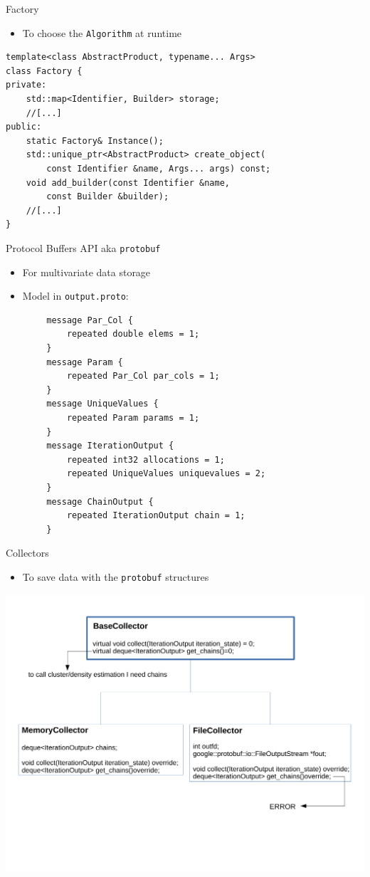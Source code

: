 \begin{frame}[fragile]{Factory}
\begin{itemize}
	\item To choose the \verb|Algorithm| at runtime
\end{itemize}

\begin{verbatim}
template<class AbstractProduct, typename... Args>
class Factory {
private:
    std::map<Identifier, Builder> storage;
    //[...]
public:
    static Factory& Instance();
    std::unique_ptr<AbstractProduct> create_object(
        const Identifier &name, Args... args) const;
    void add_builder(const Identifier &name,
        const Builder &builder);
    //[...]
}
\end{verbatim}
\end{frame}


\begin{frame}[fragile] {Protocol Buffers API aka \texttt{protobuf}}
\begin{itemize}
	\item For multivariate data storage
	\item Model in \texttt{output.proto}:
\end{itemize}
\begin{small}
\begin{verbatim}
        message Par_Col {
            repeated double elems = 1;
        }
        message Param {
            repeated Par_Col par_cols = 1;
        }
        message UniqueValues {
            repeated Param params = 1;
        }
        message IterationOutput {
            repeated int32 allocations = 1;
            repeated UniqueValues uniquevalues = 2;
        }
        message ChainOutput {
            repeated IterationOutput chain = 1;
        }
\end{verbatim}
\end{small}
\end{frame}


\begin{frame}{Collectors}
\begin{itemize}
	\item To save data with the \texttt{protobuf} structures
\end{itemize}
	\begin{center}
		\includegraphics[scale=0.35]{etc/collectors.pdf}
	\end{center}
\end{frame}
